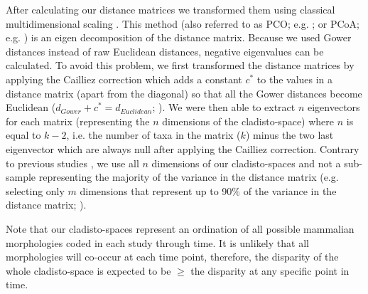 \documentclass[12pt,letterpaper]{article}
\renewcommand{\subsubsection}[1]{%
\vspace{2ex}
\noindent
\textit{#1.}---}
\begin{document}
After calculating our distance matrices we transformed them using classical multidimensional scaling \citep[MDS;][]{torgerson1965multidimensional,GOWER01121966,cailliez1983analytical}.
This method (also referred to as PCO; e.g. \citealt{Brusatte2015}; or PCoA; e.g. \citealt{paradisape:2004}) is an eigen decomposition of the distance matrix.
Because we used Gower distances instead of raw Euclidean distances, negative eigenvalues can be calculated.
To avoid this problem, we first transformed the distance matrices by applying the Cailliez correction \citep{cailliez1983analytical} which adds a constant $c^*$ to the values in a distance matrix (apart from the diagonal) so that all the Gower distances become Euclidean ($d_{Gower}+c^*=d_{Euclidean}$; \citealt{cailliez1983analytical}). 
We were then able to extract $n$ eigenvectors for each matrix (representing the $n$ dimensions of the cladisto-space) where $n$ is equal to $k-2$, i.e. the number of taxa in the matrix ($k$) minus the two last eigenvector which are always null after applying the Cailliez correction.
Contrary to previous studies \citep[e.g][]{brusatte50,cisneros2010,prentice2011,anderson2012using,Hughes20082013,bentonmodels2014}, we use all $n$ dimensions of our cladisto-spaces and not a sub-sample representing the majority of the variance in the distance matrix (e.g. selecting only $m$ dimensions that represent up to 90\% of the variance in the distance matrix; \citealt{Brusatte12092008,toljagictriassic-jurassic2013}).

Note that our cladisto-spaces represent an ordination of all possible mammalian morphologies coded in each study through time.
It is unlikely that all morphologies will co-occur at each time point, therefore, the disparity of the whole cladisto-space is expected to be $\geq$ the disparity at any specific point in time.
\end{document}
